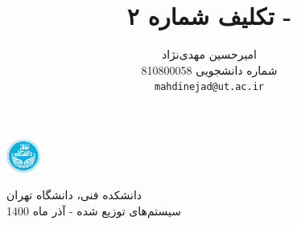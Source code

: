 \documentclass{article}
\title{تکلیف شماره ۲ - \lr{Logical Clock}}
\author{%
  امیرحسین مهدی‌نژاد\\
  شماره دانشجویی 810800058\\
  \texttt{mahdinejad@ut.ac.ir} \\
}
\begin{document}
\begin{minipage}{0.1\textwidth}%
\includegraphics[width=1.1cm]{Photos/UT_logo.png}
\end{minipage}%
\hfill%
\begin{minipage}{0.9\textwidth}\raggedleft
دانشکده فنی، دانشگاه تهران\\
سیستم‌های توزیع شده - 
آذر
ماه 1400\\
\end{minipage}

\makepertitle


\end{document}
